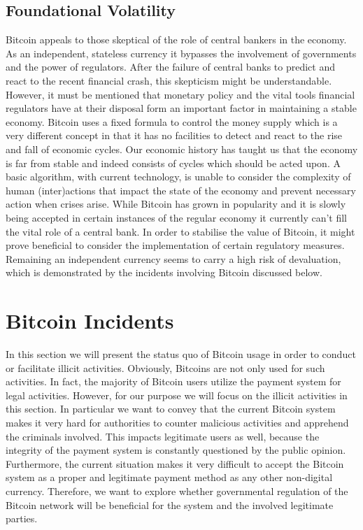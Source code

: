\documentclass[12pt,journal,compsoc]{IEEEtran}
\begin{document}
\subsection{Foundational Volatility}
Bitcoin appeals to those skeptical of the role of central bankers in the economy. As an independent, stateless currency it bypasses the involvement of governments and the power of regulators.
After the failure of central banks to predict and react to the recent financial crash, this skepticism might be understandable. However, it must be mentioned that monetary policy and the vital tools financial regulators have at their disposal form an important factor in maintaining a stable economy. Bitcoin uses a fixed formula to control the money supply which is a very different concept in that it has no facilities to detect and react to the rise and fall of economic cycles\cite{brito2013bitcoin}.
Our economic history has taught us that the economy is far from stable and indeed consists of cycles which should be acted upon. A basic algorithm, with current technology, is unable to consider the complexity of human (inter)actions that impact the state of the economy and prevent necessary action when crises arise.
While Bitcoin has grown in popularity and it is slowly being accepted in certain instances of the regular economy it currently can't fill the vital role of a central bank. In order to stabilise the value of Bitcoin, it might prove beneficial to consider the implementation of certain regulatory measures. Remaining an independent currency seems to carry a high risk of devaluation, which is demonstrated by the incidents involving Bitcoin discussed below.

\section{Bitcoin Incidents}

In this section we will present the status quo of Bitcoin usage in order to conduct or facilitate illicit activities.
Obviously, Bitcoins are not only used for such activities. In fact, the majority of Bitcoin users utilize the payment system for legal activities. However, for our purpose we will focus on the illicit activities in this section. In particular we want to convey that the current Bitcoin system makes it very hard\cite{reid2013analysis} for authorities to counter malicious activities and apprehend the criminals involved. This impacts legitimate users as well, because the integrity of the payment system is constantly questioned by the public opinion. Furthermore, the current situation makes it very difficult to accept the Bitcoin system as a proper and legitimate payment method as any other non-digital currency. Therefore, we want to explore whether governmental regulation of the Bitcoin network will be beneficial for the system and the involved legitimate parties.
\end{document}
